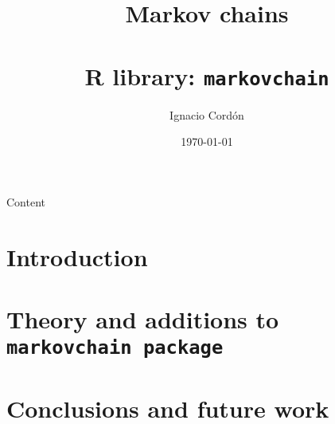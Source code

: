 \documentclass[english,9pt, notheorems, xcolor=dvipsnames]{beamer}
\title{Markov chains\\ ~\\R library: \texttt{markovchain}}
\author{Ignacio Cordón}
\date{\today}
\begin{document}
 \setcounter{showProgressBar}{0}
 \setcounter{showSlideNumbers}{0}

 \frame{\titlepage}
 
  \begin{frame}{Content}
  \tableofcontents
 \end{frame}

 \setcounter{framenumber}{0}
 \setcounter{showProgressBar}{1}
 \setcounter{showSlideNumbers}{1}
 
 \section{Introduction}
  
  

 \section{Theory and additions to \texttt{markovchain package}}
  
  
 \section{Conclusions and future work}
 
 
 
\end{document}
